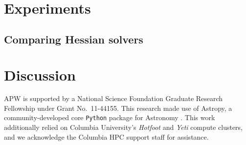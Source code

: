 \documentclass[letterpaper,12pt,preprint]{aastex}
\begin{document}

\section{Experiments}\label{sec:experiments}

\subsection{Comparing Hessian solvers}


\section{Discussion}\label{sec:discussion}

\acknowledgements
APW is supported by a National Science Foundation Graduate Research Fellowship under Grant No.\ 11-44155. 
This research made use of Astropy, a community-developed core \texttt{Python} package for Astronomy \citep{astropy13}.
This work additionally relied on Columbia University's \emph{Hotfoot} and \emph{Yeti} compute clusters, and we acknowledge the Columbia HPC support staff for assistance. \\



\end{document}
